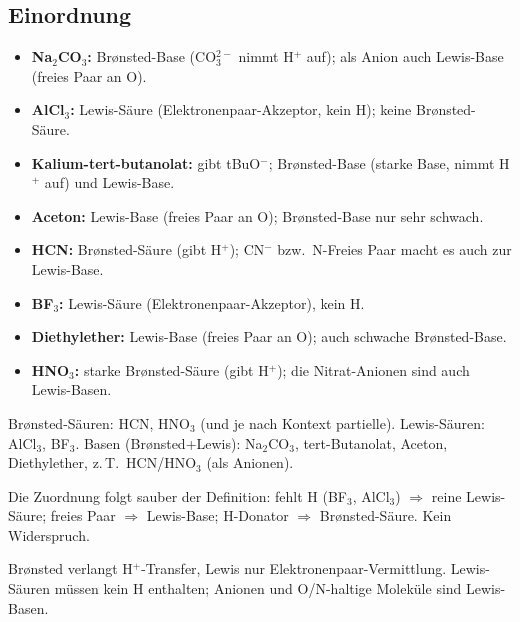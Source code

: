 
\subsection*{Einordnung}
\begin{itemize}
  \item \textbf{Na$_2$CO$_3$:} Brønsted-Base (CO$_3^{2-}$ nimmt H$^+$ auf);
        als Anion auch Lewis-Base (freies Paar an O).
  \item \textbf{AlCl$_3$:} Lewis-Säure (Elektronenpaar-Akzeptor, kein H);
        keine Brønsted-Säure.
  \item \textbf{Kalium-tert-butanolat:} gibt tBuO$^-$; Brønsted-Base
        (starke Base, nimmt H$^+$ auf) und Lewis-Base.
  \item \textbf{Aceton:} Lewis-Base (freies Paar an O); Brønsted-Base nur
        sehr schwach.
  \item \textbf{HCN:} Brønsted-Säure (gibt H$^+$); CN$^-$ bzw.\ N-Freies Paar
        macht es auch zur Lewis-Base.
  \item \textbf{BF$_3$:} Lewis-Säure (Elektronenpaar-Akzeptor), kein H.
  \item \textbf{Diethylether:} Lewis-Base (freies Paar an O); auch schwache
        Brønsted-Base.
  \item \textbf{HNO$_3$:} starke Brønsted-Säure (gibt H$^+$); die
        Nitrat-Anionen sind auch Lewis-Basen.
\end{itemize}

\begin{ergebnis}
Brønsted-Säuren: HCN, HNO$_3$ (und je nach Kontext partielle).
Lewis-Säuren: AlCl$_3$, BF$_3$.
Basen (Brønsted+Lewis): Na$_2$CO$_3$, tert-Butanolat, Aceton, Diethylether,
z.\,T.\ HCN/HNO$_3$ (als Anionen).
\end{ergebnis}

\begin{kontrolle}
Die Zuordnung folgt sauber der Definition: fehlt H (BF$_3$, AlCl$_3$)
$\Rightarrow$ reine Lewis-Säure; freies Paar $\Rightarrow$ Lewis-Base;
H-Donator $\Rightarrow$ Brønsted-Säure. Kein Widerspruch.
\end{kontrolle}

\begin{merksatz}
Brønsted verlangt H$^+$-Transfer, Lewis nur Elektronenpaar-Vermittlung.
Lewis-Säuren müssen kein H enthalten; Anionen und O/N-haltige Moleküle sind
Lewis-Basen.
\end{merksatz}
